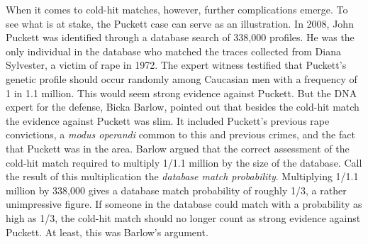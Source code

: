 \documentclass{article}
\begin{document}
   
  When it comes to cold-hit matches, however,  further complications emerge. %
  To see what is at stake, the Puckett case can serve as an illustration. In 2008, John Puckett was identified through a database search of 338,000 profiles. He was the only individual in the database who matched the traces collected from Diana Sylvester, a victim of rape  in 1972. The expert witness testified that %
Puckett's genetic profile 
should occur randomly among Caucasian men with a frequency of 1 in 1.1 million. This would seem strong evidence against Puckett. 
But the DNA expert  for the defense, Bicka Barlow,  pointed out that 
besides the cold-hit match the evidence against Puckett was slim. It included Puckett's previous rape convictions, a \textit{modus operandi} common to this and previous crimes, and the fact that Puckett was in the area. 
Barlow argued
that the correct assessment of  the cold-hit match required to multiply 1/1.1 million  by the size of the database. Call the result of this multiplication the \textit{database match probability}. Multiplying 1/1.1 million by 338,000 gives a database match probability of roughly 1/3, a rather unimpressive figure.  %
If someone in the database could match with a probability as high as 1/3, the cold-hit match should no longer count as strong evidence against Puckett. At least, this was Barlow's argument. 




\end{document}
